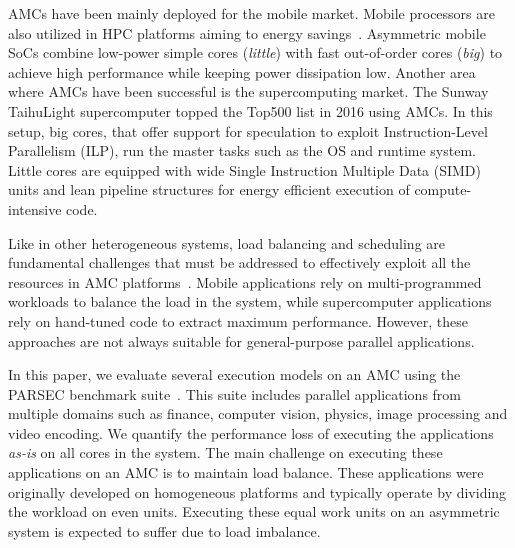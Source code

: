 AMCs have been mainly deployed for the mobile market. 
Mobile processors are also utilized in HPC platforms aiming to energy savings~\cite{ARMV8}.
Asymmetric mobile SoCs combine low-power simple cores (\emph{little}) with fast out-of-order cores (\emph{big}) to achieve high performance while keeping power dissipation low.
Another area where AMCs have been successful is the supercomputing market.
The Sunway TaihuLight supercomputer topped the Top500 list in 2016 using AMCs. 
In this setup, big cores, that offer support for speculation to exploit Instruction-Level Parallelism (ILP), run the master tasks such as the OS and runtime system.
Little cores are equipped with wide Single Instruction Multiple Data (SIMD) units and lean pipeline structures for energy efficient execution of compute-intensive code. 

Like in other heterogeneous systems, load balancing and scheduling are fundamental challenges that must be addressed to effectively exploit all the resources in AMC platforms~\cite{Suleman:APLOS2009,Fedorova2009,Greenhalgh2011,Joao:ASPLOS2012,Joao:ISCA2013,ARM4HPC_SC13}. 
Mobile applications rely on multi-programmed workloads to balance the load in the system, while supercomputer applications rely on hand-tuned code to extract maximum performance. 
However, these approaches are not always suitable for general-purpose parallel applications.

In this paper, we evaluate several execution models on an AMC using the PARSEC benchmark suite~\cite{PARSEC3}. 
This suite includes parallel applications from multiple domains such as finance, computer vision, physics, image processing and video encoding. 
We quantify the performance loss of executing the applications \textit{as-is} on all cores in the system. 
The main challenge on executing these applications on an AMC is to maintain load balance. 
These applications were originally developed on homogeneous platforms and typically operate by dividing the workload on even units. 
Executing these equal work units on an asymmetric system is expected to suffer due to load imbalance.


